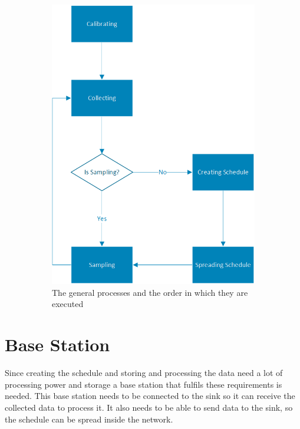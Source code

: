 \begin{figure}[htbp]
\begin{subfigure}[t]{0.4\textwidth}
        \includegraphics[scale=0.7]{content/images/GeneralAproachM}
        \caption{The general processes and the order in which they are executed}
        \label{fig:link}
    \end{subfigure}
    \caption{}
\end{figure}

\section{Base Station}
Since creating the schedule and storing and processing the data need a lot of processing power and storage a base station that fulfils these requirements is needed. This base station needs to be connected to the sink so it can receive the collected data to process it. It also needs to be able to send data to the sink, so the schedule can be spread inside the network.    
